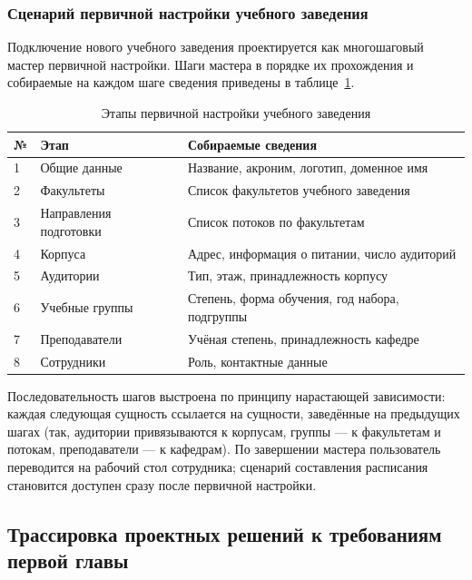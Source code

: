 \subsubsection{Сценарий первичной настройки учебного заведения}
\label{subsubsec:onboarding-scenario}

Подключение нового учебного заведения проектируется как многошаговый мастер первичной настройки. Шаги мастера в порядке их прохождения и собираемые на каждом шаге сведения приведены в таблице~\ref{tab:onboarding-steps}.

\begin{table}[h]
  \caption{Этапы первичной настройки учебного заведения}
  \label{tab:onboarding-steps}
  \centering
  \small
  \begin{tabular}{p{} p{} p{}}
    \toprule
    №   & Этап & Собираемые сведения \\
    \midrule
    1 & Общие данные                & Название, акроним, логотип, доменное имя \\
    2 & Факультеты                  & Список факультетов учебного заведения \\
    3 & Направления подготовки      & Список потоков по факультетам \\
    4 & Корпуса                     & Адрес, информация о питании, число аудиторий \\
    5 & Аудитории                   & Тип, этаж, принадлежность корпусу \\
    6 & Учебные группы              & Степень, форма обучения, год набора, подгруппы \\
    7 & Преподаватели               & Учёная степень, принадлежность кафедре \\
    8 & Сотрудники                  & Роль, контактные данные \\
    \bottomrule
  \end{tabular}
\end{table}

Последовательность шагов выстроена по принципу нарастающей зависимости: каждая следующая сущность ссылается на сущности, заведённые на предыдущих шагах (так, аудитории привязываются к корпусам, группы --- к факультетам и потокам, преподаватели --- к кафедрам). По завершении мастера пользователь переводится на рабочий стол сотрудника; сценарий составления расписания становится доступен сразу после первичной настройки.

\subsection{Трассировка проектных решений к требованиям первой главы}
\label{subsec:traceability}

